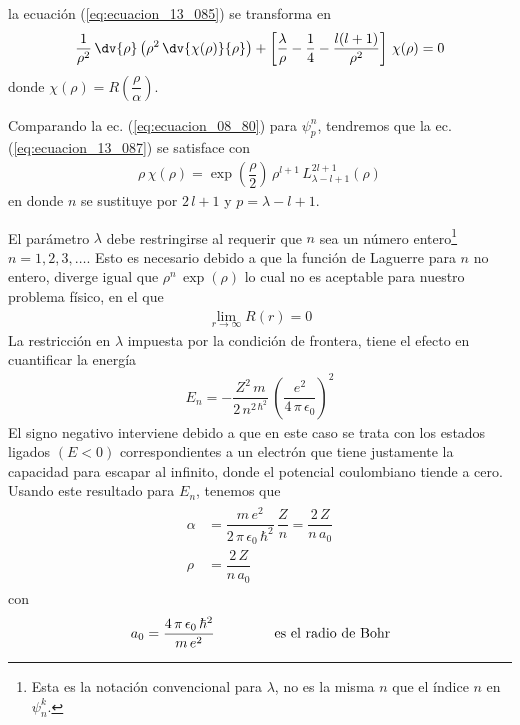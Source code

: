 la ecuación (\ref{eq:ecuacion_13_085}) se transforma en
\begin{align}
\dfrac{1}{\rho^{2}} \, \dv{\rho} \left( \rho^{2} \, \dv{\chi (\rho)}{\rho} \right) + \left[ \dfrac{\lambda}{\rho} - \dfrac{1}{4} - \dfrac{l (l+1)}{\rho^{2}} \right] \, \chi (\rho) = 0
\label{eq:ecuacion_13_087}
\end{align}
donde $\chi(\rho) = R \left( \dfrac{\rho}{\alpha} \right)$.
\par
Comparando la ec. (\ref{eq:ecuacion_08_80}) para $\psi_{p}^{n}$, tendremos que la ec. (\ref{eq:ecuacion_13_087}) se satisface con
\begin{align}
\rho \, \chi (\rho) = \exp \left( \dfrac{\rho}{2} \right) \, \rho^{l + 1} \, L_{\lambda - l + 1}^{2 l +1} (\rho)
\label{eq:ecuacion_13_088}
\end{align}
en donde $n$ se sustituye por $ 2 \, l + 1$ y $p = \lambda - l + 1$.
\par
El parámetro $\lambda$ debe restringirse al requerir que $n$ sea un número entero\footnote{Esta es la notación convencional para $\lambda$, no es la misma $n$ que el índice $n$ en $\psi_{n}^{k}$.} $n = 1, 2, 3 , \ldots$. Esto es necesario debido a que la función de Laguerre para $n$ no entero, diverge igual que $\rho^{n} \, \exp(\rho)$ lo cual no es aceptable para nuestro problema físico, en el que
\begin{align*}
\lim_{r \to \infty} R(r) = 0
\end{align*}
La restricción en $\lambda$ impuesta por la condición de frontera, tiene el efecto en cuantificar la energía
\begin{align}
E_{n} = - \dfrac{Z^{2} \, m}{2 \, n^{2 \, \hbar^{2}}} \, \left( \dfrac{e^{2}}{4 \, \pi \, \epsilon_{0}} \right)^{2}
\label{eq:ecuacion_13_089}
\end{align}
El signo negativo interviene debido a que en este caso se trata con los estados ligados $(E < 0)$ correspondientes a un electrón que tiene justamente la capacidad para escapar al infinito, donde el potencial coulombiano tiende a cero. Usando este resultado para $E_{n}$, tenemos que
\begin{align}
\begin{aligned}
\alpha &= \dfrac{m \, e^{2}}{2 \, \pi \, \epsilon_{0} \, \hbar^{2}} \, \dfrac{Z}{n} = \dfrac{2 \, Z}{n \, a_{0}} \\[0.5em]
\rho &= \dfrac{2 \, Z}{n \, a_{0}}
\end{aligned}
\label{eq:ecuacion_13_090}
\end{align}
con
\begin{align*}
a_{0} = \dfrac{4 \, \pi \, \epsilon_{0} \, \hbar^{2}}{m \, e^{2}} \hspace{1.5cm} \mbox{es el radio de Bohr}
\end{align*}
